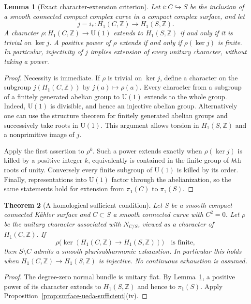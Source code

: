 \documentclass[11pt]{amsart}
\newtheorem{theorem}{Theorem}[section]
\newtheorem{lemma}[theorem]{Lemma}
\theoremstyle{definition}
\theoremstyle{remark}
\numberwithin{equation}{section}
\newcommand{\Uone}{\mathrm U(1)}
\begin{document}
\begin{lemma}[Exact character-extension criterion]\label{lem:characters}
Let $i:C\hookrightarrow S$ be the inclusion of a smooth connected compact complex curve in a
compact complex surface, and let
\[
 j=i_*:H_1(C,\mathbb Z)\longrightarrow H_1(S,\mathbb Z).
\]
A character $\rho:H_1(C,\mathbb Z)\to\Uone$ extends to $H_1(S,\mathbb Z)$ if and only if it
is trivial on $\ker j$. A positive power of $\rho$ extends if and only if $\rho(\ker j)$ is
finite. In particular, injectivity of $j$ implies extension of every unitary character,
without taking a power.
\end{lemma}
\begin{proof}
Necessity is immediate. If $\rho$ is trivial on $\ker j$, define a character on the subgroup
$j(H_1(C,\mathbb Z))$ by $j(a)\mapsto\rho(a)$. Every character from a subgroup of a finitely
generated abelian group to $\Uone$ extends to the whole group. Indeed, $\Uone$ is divisible,
and hence an injective abelian group. Alternatively one can use the structure theorem for
finitely generated abelian groups and successively take roots in $\Uone$. This argument
allows torsion in $H_1(S,\mathbb Z)$ and a nonprimitive image of $j$.

Apply the first assertion to $\rho^k$. Such a power extends exactly when $\rho(\ker j)$ is
killed by a positive integer $k$, equivalently is contained in the finite group of $k$th
roots of unity. Conversely every finite subgroup of $\Uone$ is killed by its order. Finally,
representations into $\Uone$ factor through the abelianization, so the same statements hold
for extension from $\pi_1(C)$ to $\pi_1(S)$.
\end{proof}

\begin{theorem}[A homological sufficient condition]\label{thm:homology}
Let $S$ be a smooth compact connected K\"ahler surface and $C\subset S$ a smooth connected
curve with $C^2=0$. Let $\rho$ be the unitary character associated with $N_{C/S}$, viewed as
a character of $H_1(C,\mathbb Z)$. If
\[
 \rho\bigl(\ker(H_1(C,\mathbb Z)\to H_1(S,\mathbb Z))\bigr)
 \quad\text{is finite},
\]
then $S\setminus C$ admits a smooth plurisubharmonic exhaustion. In particular this holds
when $H_1(C,\mathbb Z)\to H_1(S,\mathbb Z)$ is injective. No continuous exhaustion is
assumed.
\end{theorem}
\begin{proof}
The degree-zero normal bundle is unitary flat. By
Lemma~\ref{lem:characters}, a positive power of its character extends
to $H_1(S,\mathbb Z)$ and hence to $\pi_1(S)$. Apply
Proposition~\ref{prop:surface-ueda-sufficient}\textup{(iv)}.
\end{proof}
\end{document}
